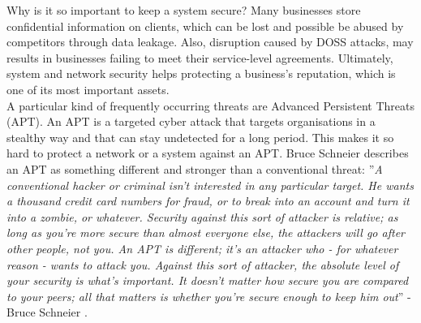 Why is it so important to keep a system secure?  Many businesses store confidential information on clients, which can be lost and possible be abused by competitors through data leakage. Also, disruption caused by DOSS attacks, may results in businesses failing to meet their service-level agreements. Ultimately, system and network security helps protecting a business's reputation, which is one of its most important assets. \\

A particular kind of frequently occurring threats are Advanced Persistent Threats (APT). An APT is a targeted cyber attack that targets organisations in a stealthy way and that can stay undetected for a long period. This makes it so hard to protect a network or a system against an APT. Bruce Schneier describes an APT as something different and stronger than a conventional threat: ''\textit{A conventional hacker or criminal isn't interested in any particular target. He wants a thousand credit card numbers for fraud, or to break into an account and turn it into a zombie, or whatever. Security against this sort of attacker is relative; as long as you're more secure than almost everyone else, the attackers will go after other people, not you. An APT is different; it's an attacker who - for whatever reason - wants to attack you. Against this sort of attacker, the absolute level of your security is what's important. It doesn't matter how secure you are compared to your peers; all that matters is whether you're secure enough to keep him out}'' - Bruce Schneier \cite{APTBruce}.\\


